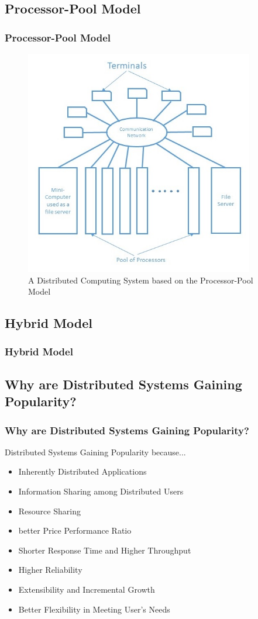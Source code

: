 \documentclass{beamer}
\begin{document}
\subsection{Processor-Pool Model}
\begin{frame}
    \frametitle{Processor-Pool Model}
    \begin{figure}[h!]
      \centering
      \includegraphics[width=10cm]{processorPoolModel}
      \caption{A Distributed Computing System based on the Processor-Pool Model}\label{processorpoolmodel}
    \end{figure}
\end{frame}
\subsection{Hybrid Model}
\begin{frame}
    \frametitle{Hybrid Model}
\end{frame}



\subsection{Why are Distributed Systems Gaining Popularity?}
\begin{frame}
    \frametitle{Why are Distributed Systems Gaining Popularity?}
    Distributed Systems Gaining Popularity because...
    \begin{itemize}
      \item Inherently Distributed Applications
      \item Information Sharing among Distributed Users
      \item Resource Sharing
      \item better Price Performance Ratio
      \item Shorter Response Time and Higher Throughput
      \item Higher Reliability
      \item Extensibility and Incremental Growth
      \item Better Flexibility in Meeting User's Needs
    \end{itemize}
    \vspace{2cm}
\end{frame}
\end{document}
